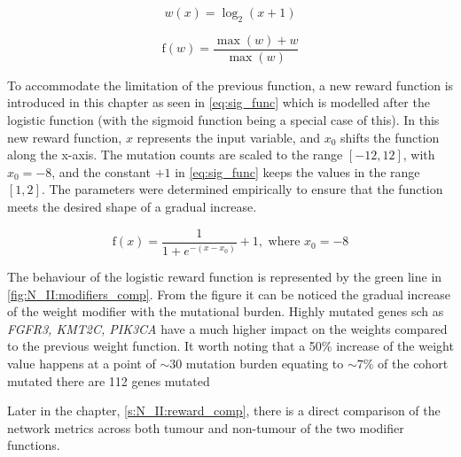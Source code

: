 \begin{equation} \label{eq:n_II:w}
    w(x) = \log_2(x+1)
\end{equation}

\begin{equation} \label{eq:n_II:norm3_func}
\text{f}(w) = \frac{\max(w) + w}{\max(w)}
\end{equation}

To accommodate the limitation of the previous function, a new reward function is introduced in this chapter as seen in \cref{eq:sig_func} which is modelled after the logistic function (with the sigmoid function being a special case of this). In this new reward function, $x$ represents the input variable, and $x_0$ shifts the function along the x-axis. The mutation counts are scaled to the range $[-12, 12]$, with $x_0 = -8$, and the constant $+1$ in \cref{eq:sig_func} keeps the values in the range $[1, 2]$. The parameters were determined empirically to ensure that the function meets the desired shape of a gradual increase.

\begin{equation} \label{eq:sig_func}
\text{f}(x) =  \frac{1}{1 + e^{-(x - x_0)}} + 1, \text{ where } x_0=-8
\end{equation}

The behaviour of the logistic reward function is represented by the green line in \cref{fig:N_II:modifiers_comp}. From the figure it can be noticed the gradual increase of the weight modifier with the mutational burden. Highly mutated genes sch as \textit{FGFR3, KMT2C, PIK3CA} have a much higher impact on the weights compared to the previous weight function. It worth noting that a 50\% increase of the weight value happens at a point of $\sim30$ mutation burden equating to $\sim7\%$ of the cohort mutated there are 112 genes mutated

Later in the chapter, \cref{s:N_II:reward_comp}, there is a direct comparison of the network metrics across both tumour and non-tumour of the two modifier functions.

